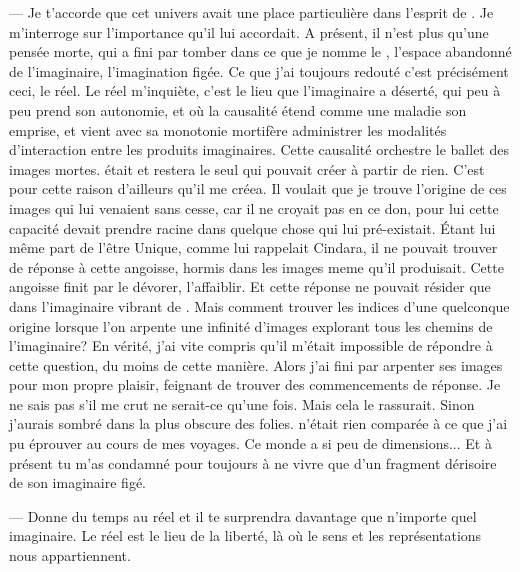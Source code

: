 --- Je t'accorde que cet univers avait une place particulière dans l'esprit de \Mey. Je m'interroge sur l'importance qu'il lui accordait. A présent, il n'est plus qu'une pensée morte, qui a fini par tomber dans ce que je nomme le \reel, l'espace abandonné de l'imaginaire, l'imagination figée.  Ce que j'ai toujours redouté c'est précisément ceci, le réel. Le réel m'inquiète, c'est le lieu que l'imaginaire a déserté, qui peu à peu prend son autonomie, et où la causalité étend comme une maladie son emprise, et vient avec sa monotonie mortifère administrer les modalités d'interaction entre les produits imaginaires. Cette causalité orchestre le ballet des images mortes. \Mey était et restera le seul qui pouvait créer à partir de rien. C'est pour cette raison d'ailleurs qu'il me créea. Il voulait que je trouve l'origine de ces images qui lui venaient sans cesse, car il ne croyait pas en ce don, pour lui cette capacité devait prendre racine dans quelque chose qui lui pré-existait. Étant lui même part de l'être Unique, comme lui rappelait Cindara, il ne pouvait trouver de réponse à cette angoisse, hormis dans les images meme qu'il produisait. Cette angoisse finit par le dévorer, l'affaiblir.   
Et cette réponse ne pouvait résider que dans l'imaginaire vibrant de \Mey. Mais comment trouver les indices d'une quelconque origine lorsque l'on arpente une infinité d'images explorant tous les chemins de l'imaginaire? En vérité, j'ai vite compris qu'il m'était impossible de répondre à cette question, du moins de cette manière. Alors j'ai fini par arpenter ses images pour mon propre plaisir, feignant de trouver des commencements de réponse. Je ne sais pas s'il me crut ne serait-ce qu'une fois. Mais cela le rassurait. Sinon j'aurais sombré dans la plus obscure des folies.  \Auga n'était rien comparée à ce que j'ai pu éprouver au cours de mes voyages. Ce monde a si peu de dimensions... Et à présent tu m'as condamné pour toujours à ne vivre que d'un fragment dérisoire de son imaginaire figé.


--- Donne du temps au réel et il te surprendra davantage que n'importe quel imaginaire. Le réel est le lieu de la liberté, là où le sens et les représentations nous appartiennent.


